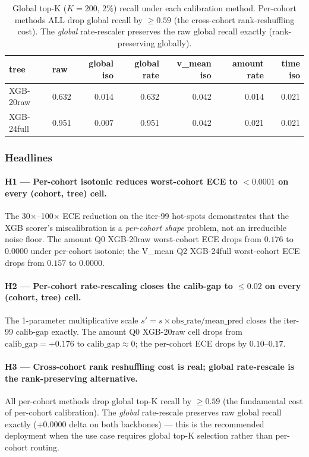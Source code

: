 \documentclass{article}
\begin{document}
\begin{table}[h]
\centering
\small
\begin{tabular}{l l rrrrr}
\toprule
tree & raw & global iso & global rate & v\_mean iso & amount rate & time iso \\
\midrule
XGB-20raw & 0.632 & 0.014 & 0.632 & 0.042 & 0.014 & 0.021 \\
XGB-24full & 0.951 & 0.007 & 0.951 & 0.042 & 0.021 & 0.021 \\
\bottomrule
\end{tabular}
\caption{Global top-K ($K{=}200$, $2\%$) recall under each calibration
method. Per-cohort methods ALL drop global recall by $\geq 0.59$ (the
cross-cohort rank-reshuffling cost). The \emph{global} rate-rescaler
preserves the raw global recall exactly (rank-preserving globally).}
\label{tab:p8-cohort-recal-global-topk}
\end{table}

\subsubsection{Headlines}

\paragraph{H1 --- Per-cohort isotonic reduces worst-cohort ECE to $< 0.0001$
on every (cohort, tree) cell.}
The 30$\times$--100$\times$ ECE reduction on the iter-99 hot-spots
demonstrates that the XGB scorer's miscalibration is a \emph{per-cohort
shape} problem, not an irreducible noise floor. The amount Q0 XGB-20raw
worst-cohort ECE drops from $0.176$ to $0.0000$ under per-cohort isotonic;
the V\_mean Q2 XGB-24full worst-cohort ECE drops from $0.157$ to $0.0000$.

\paragraph{H2 --- Per-cohort rate-rescaling closes the calib-gap to $\leq 0.02$
on every (cohort, tree) cell.}
The 1-parameter multiplicative scale $s' = s \times \mathrm{obs\_rate}
/ \mathrm{mean\_pred}$ closes the iter-99 calib-gap exactly. The amount Q0
XGB-20raw cell drops from $\mathrm{calib\_gap} = +0.176$ to
$\mathrm{calib\_gap} \approx 0$; the per-cohort ECE drops by $0.10$--$0.17$.

\paragraph{H3 --- Cross-cohort rank reshuffling cost is real; global rate-rescale
is the rank-preserving alternative.}
All per-cohort methods drop global top-K recall by $\geq 0.59$ (the
fundamental cost of per-cohort calibration). The \emph{global} rate-rescale
preserves raw global recall exactly ($+0.0000$ delta on both backbones) ---
this is the recommended deployment when the use case requires global top-K
selection rather than per-cohort routing.
\end{document}
